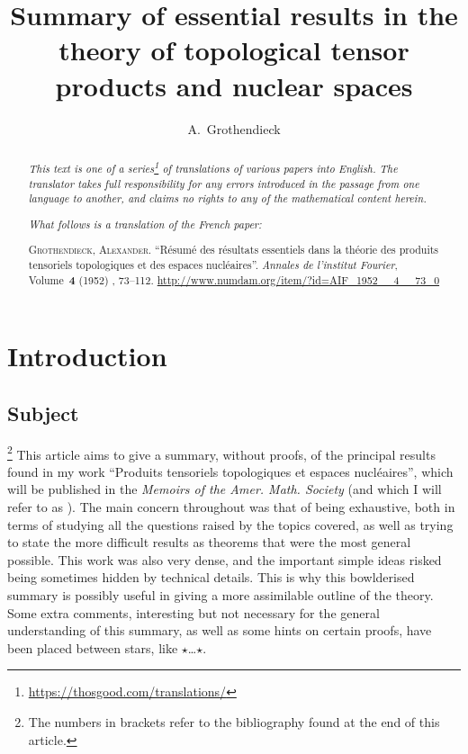 \documentclass{article}
\title{Summary of essential results in the theory of topological tensor products and nuclear spaces}
\author{A.~Grothendieck}
\date{}
\theoremstyle{plain}
\newcommand{\aster}[1]{$\star${#1}$\star$}
\newcommand{\oldpage}[1]{\marginpar{\footnotesize$\Big\vert$ \textit{p.~#1}}}
\begin{document}
\maketitle
\thispagestyle{fancy}

\renewcommand{\abstractname}{Translator's note.}

\begin{abstract}
  \renewcommand*{\thefootnote}{\fnsymbol{footnote}}
  \emph{This text is one of a series\footnote{\url{https://thosgood.com/translations/}} of translations of various papers into English.}
  \emph{The translator takes full responsibility for any errors introduced in the passage from one language to another, and claims no rights to any of the mathematical content herein.}

  \medskip
  
  \emph{What follows is a translation of the French paper:}

  \medskip\noindent
  \textsc{Grothendieck, Alexander}.
  ``R\'{e}sum\'{e} des r\'{e}sultats essentiels dans la th\'{e}orie des produits tensoriels topologiques et des espaces nucl\'{e}aires''.
  \emph{Annales de l'institut Fourier}, Volume~\textbf{4} (1952) , 73--112.
  {\url{http://www.numdam.org/item/?id=AIF_1952__4__73_0}}
\end{abstract}

\setcounter{footnote}{0}

\tableofcontents
\bigskip



\section*{Introduction}
\label{section:introduction}
%


\subsection*{Subject}
\label{subsection:subject}
%

\oldpage{73}

\footnote{The numbers in brackets refer to the bibliography found at the end of this article.}
This article aims to give a summary, without proofs, of the principal results found in my work ``Produits tensoriels topologiques et espaces nucl\'{e}aires'', which will be published in the \emph{Memoirs of the Amer. Math. Society} (and which I will refer to as \cite{PTT}).
The main concern throughout \cite{PTT} was that of being exhaustive, both in terms of studying all the questions raised by the topics covered, as well as trying to state the more difficult results as theorems that were the most general possible.
This work was also very dense, and the important simple ideas risked being sometimes hidden by technical details.
This is why this bowlderised summary is possibly useful in giving a more assimilable outline of the theory.
Some extra comments, interesting but not necessary for the general understanding of this summary, as well as some hints on certain proofs, have been placed between stars, like \aster{\ldots}.
\end{document}
